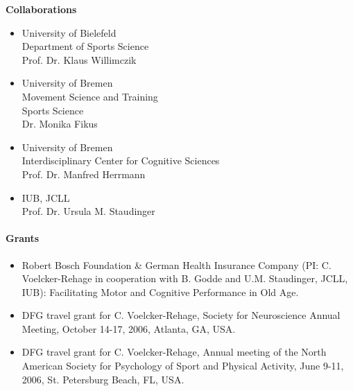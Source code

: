 \textbf{Collaborations}
\begin{itemize}
\item University of Bielefeld \\ Department of Sports Science \\ Prof. Dr. Klaus Willimczik
\item University of Bremen \\ Movement Science and Training\\ Sports Science \\ Dr. Monika Fikus
\item University of Bremen \\ Interdisciplinary Center for Cognitive Sciences \\ Prof. Dr. Manfred Herrmann
\item IUB, JCLL \\ Prof. Dr. Ursula M. Staudinger
\end{itemize}

\begin{bibunit}[apalike]
\nocite{*}
\putbib[profBenGodde2]
\end{bibunit}

\paragraph{Grants}
\begin{itemize}
\item Robert Bosch Foundation \& German Health Insurance Company (PI: C. Voelcker-Rehage in cooperation with B. Godde and U.M. Staudinger, JCLL, IUB): Facilitating Motor and Cognitive Performance in Old Age.
\item DFG travel grant for C. Voelcker-Rehage, Society for Neuroscience Annual Meeting, October 14-17, 2006, Atlanta, GA, USA.
\item DFG travel grant for C. Voelcker-Rehage, Annual meeting of the North American Society for Psychology of Sport and Physical Activity, June 9-11, 2006, St. Petersburg Beach, FL, USA.
\end{itemize}



